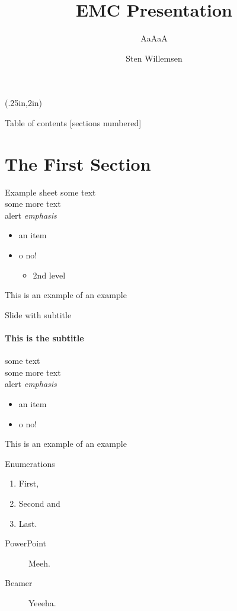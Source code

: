 \documentclass[12pt, dutch]{beamer}
\author{Sten Willemsen}
\title{EMC Presentation}
\subtitle{AaAaA}
\begin{document}
\begin{frame}
	\titlepage
\begin{textblock*}{\textwidth}(.25in,2in)
\end{textblock*} 
\end{frame}


\begin{frame}{Table of contents}
  [sections numbered]
  \tableofcontents[hideallsubsections]
\end{frame}

\section{The First Section}

\begin{frame}{Example sheet}
some text \\
some more text \\
\alert{alert} 
\emph{emphasis}
\begin{itemize}
\item an item
\item o \alert{no}!
\begin{itemize}
\item 2nd level
\end{itemize}
\end{itemize}
\begin{example}[An example]
This is an example of an example
\end{example}
\end{frame}



\begin{frame}{Slide with subtitle}
    \framesubtitle{This is the subtitle}
some text \\
some more text \\
\alert{alert} 
\emph{emphasis}
\begin{itemize}
\item an item
\item o \alert{no}!
\end{itemize}
\begin{example}[An example]
This is an example of an example
\end{example}
\end{frame}

\begin{frame}{Enumerations}
      \begin{enumerate}
        \item First, \item Second and \item Last.
      \end{enumerate}
       \begin{description}
        \item[PowerPoint] Meeh. \item[Beamer] Yeeeha.
      \end{description}
\end{frame}
\end{document}
